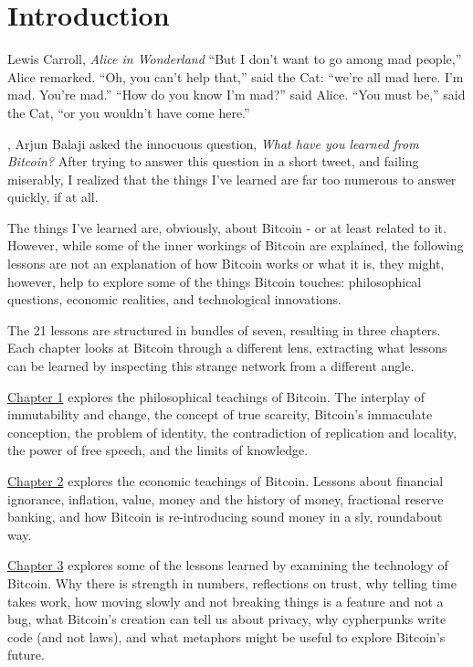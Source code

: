 \chapter{Introduction}
\label{ch:introduction}

\begin{chapquote}{Lewis Carroll, \textit{Alice in Wonderland}}
``But I don’t want to go among mad people,'' Alice remarked. ``Oh, you can’t
help that,'' said the Cat: ``we’re all mad here. I’m mad. You’re mad.'' ``How do
you know I’m mad?'' said Alice. ``You must be,'' said the Cat, ``or you wouldn’t
have come here.''
\end{chapquote}

, Arjun Balaji asked the innocuous question,
\textit{What have you learned from Bitcoin?} After trying to answer this
question in a short tweet, and failing miserably, I realized that the things
I've learned are far too numerous to answer quickly, if at all.

The things I've learned are, obviously, about Bitcoin - or at least related to
it. However, while some of the inner workings of Bitcoin are explained, the
following lessons are not an explanation of how Bitcoin works or what it is,
they might, however, help to explore some of the things Bitcoin touches:
philosophical questions, economic realities, and technological innovations.

The 21 lessons are structured in bundles of seven, resulting in three chapters.
Each chapter looks at Bitcoin through a different lens, extracting what
lessons can be learned by inspecting this strange network from a different
angle.

\hyperref[ch:philosophy]{Chapter 1} explores the philosophical teachings of
Bitcoin. The interplay of immutability and change, the concept of true scarcity,
Bitcoin's immaculate conception, the problem of identity, the contradiction of
replication and locality, the power of free speech, and the limits of knowledge.

\hyperref[ch:economics]{Chapter 2} explores the economic teachings of Bitcoin.
Lessons about financial ignorance, inflation, value, money and the history of
money, fractional reserve banking, and how Bitcoin is re-introducing sound money
in a sly, roundabout way.

\hyperref[ch:technology]{Chapter 3} explores some of the lessons learned by
examining the technology of Bitcoin.  Why there is strength in numbers,
reflections on trust, why telling time takes work, how moving slowly and not
breaking things is a feature and not a bug, what Bitcoin's creation can tell us
about privacy, why cypherpunks write code (and not laws), and what metaphors
might be useful to explore Bitcoin's future.

